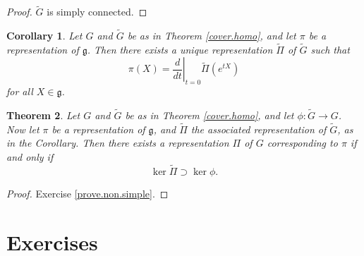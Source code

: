 \documentclass[12pt]{amsbook}
\let \frak = \mathfrak
\theoremstyle{plain}
\newtheorem{theorem}{Theorem}
\newtheorem{corollary}[theorem]{Corollary}
\numberwithin{equation}{chapter}
\numberwithin{theorem}{chapter}
\begin{document}
\begin{proof}
$\widetilde{G}$ is simply connected.
\end{proof}

\begin{corollary}
Let $G$ and $\widetilde{G}$ be as in Theorem \ref{cover.homo}, and let $\pi$
be a representation of $\frak{g}$. Then there exists a unique representation
$\widetilde{\Pi}$ of $\widetilde{G}$ such that
\[
\pi(X)=\left.  \frac{d}{dt}\right|  _{t=0}\widetilde{\Pi}\left(
e^{tX}\right)
\]
for all $X\in\frak{g}$.
\end{corollary}

\begin{theorem}
\label{non.simple}Let $G$ and $\widetilde{G}$ be as in Theorem
\ref{cover.homo}, and let $\phi:\widetilde{G}\rightarrow G$. Now let $\pi$ be
a representation of $\frak{g}$, and $\widetilde{\Pi}$ the associated
representation of $\widetilde{G}$, as in the Corollary. Then there exists a
representation $\Pi$ of $G$ corresponding to $\pi$ if and only if
\[
\ker\widetilde{\Pi}\supset\ker\phi\text{.}%
\]
\end{theorem}

\begin{proof}
Exercise \ref{prove.non.simple}.
\end{proof}

\section{Exercises}
\end{document}
